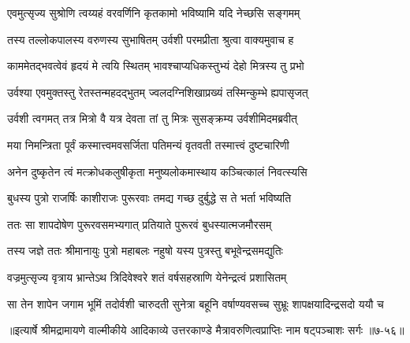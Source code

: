 \twolineshloka
{एवमुत्सृज्य सुश्रोणि त्वय्यहं वरवर्णिनि}
{कृतकामो भविष्यामि यदि नेच्छसि सङ्गमम्} %

\twolineshloka
{तस्य तल्लोकपालस्य वरुणस्य सुभाषितम्}
{उर्वशी परमप्रीता श्रुत्वा वाक्यमुवाच ह} %

\twolineshloka
{काममेतद्भवत्वेवं हृदयं मे त्वयि स्थितम्}
{भावश्चाप्यधिकस्तुभ्यं देहो मित्रस्य तु प्रभो} %

\twolineshloka
{उर्वश्या एवमुक्तस्तु रेतस्तन्महदद्भुतम्}
{ज्वलदग्निशिखाप्रख्यं तस्मिन्कुम्भे ह्यपासृजत्} %

\twolineshloka
{उर्वशी त्वगमत् तत्र मित्रो वै यत्र देवता}
{तां तु मित्रः सुसङ्क्रम्य उर्वशीमिदमब्रवीत्} %

\twolineshloka
{मया निमन्त्रिता पूर्वं कस्मात्त्वमवसर्जिता}
{पतिमन्यं वृतवती तस्मात्त्वं दुष्टचारिणी} %

\twolineshloka
{अनेन दुष्कृतेन त्वं मत्क्रोधकलुषीकृता}
{मनुष्यलोकमास्थाय कञ्चित्कालं निवत्स्यसि} %

\twolineshloka
{बुधस्य पुत्रो राजर्षिः काशीराजः पुरूरवाः}
{तमद्य गच्छ दुर्बुद्धे स ते भर्ता भविष्यति} %

\twolineshloka
{ततः सा शापदोषेण पुरूरवसमभ्यगात्}
{प्रतियाते पुरूरवं बुधस्यात्मजमौरसम्} %

\twolineshloka
{तस्य जज्ञे ततः श्रीमानायुः पुत्रो महाबलः}
{नहुषो यस्य पुत्रस्तु बभूवेन्द्रसमद्युतिः} %

\twolineshloka
{वज्रमुत्सृज्य वृत्राय भ्रान्तेऽथ त्रिदिवेश्वरे}
{शतं वर्षसहस्राणि येनेन्द्रत्वं प्रशासितम्} %

\twolineshloka
{सा तेन शापेन जगाम भूमिं तदोर्वशी चारुदती सुनेत्रा}
{बहूनि वर्षाण्यवसच्च सुभ्रूः शापक्षयादिन्द्रसदो ययौ च} %


॥इत्यार्षे श्रीमद्रामायणे वाल्मीकीये आदिकाव्ये उत्तरकाण्डे मैत्रावरुणित्वप्राप्तिः नाम षट्पञ्चाशः सर्गः ॥७-५६॥
